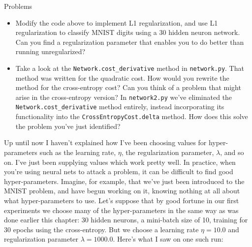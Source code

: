 \begin{exerciseBox}{Problems}


\begin{itemize}

\item Modify the code above to implement L1 regularization, and use L1 regularization to classify MNIST digits using a $30$ hidden neuron network. Can you find a regularization parameter that enables you to do better than running unregularized?

\item Take a look at the \texttt{Network.cost\_\allowbreak{}derivative} method in \texttt{network.py}. That method was written for the quadratic cost. How would you rewrite the method for the cross-entropy cost? Can you think of a problem that might arise in the cross-entropy version? In \texttt{network2.py} we've eliminated the \texttt{Network.cost\_\allowbreak{}derivative} method entirely, instead incorporating its functionality into the \texttt{CrossEntropyCost.delta} method. How does this solve the problem you've just identified?

\end{itemize}

\end{exerciseBox}





Up until now I haven't explained how I've been choosing values for hyper-parameters such as the learning rate, $\eta$, the regularization parameter, $\lambda$, and so on. I've just been supplying values which work pretty well. In practice, when you're using neural nets to attack a problem, it can be difficult to find good hyper-parameters. Imagine, for example, that we've just been introduced to the MNIST problem, and have begun working on it, knowing nothing at all about what hyper-parameters to use. Let's suppose that by good fortune in our first experiments we choose many of the hyper-parameters in the same way as was done earlier this chapter: 30 hidden neurons, a mini-batch size of 10, training for 30 epochs using the cross-entropy. But we choose a learning rate $\eta = 10.0$ and regularization parameter $\lambda = 1000.0$. Here's what I saw on one such run:



